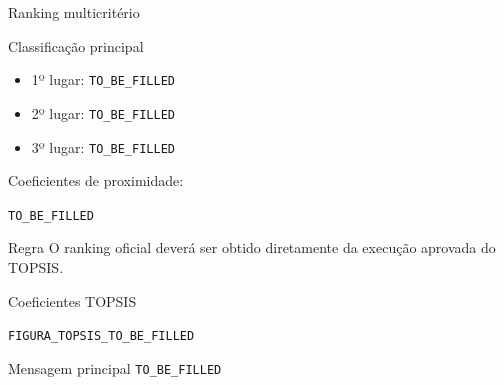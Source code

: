%
%



\begin{frame}{Ranking multicritério}

    \begin{block}{Classificação principal}
        \begin{itemize}
            \item 1º lugar:
                  \texttt{TO\_BE\_FILLED}

            \item 2º lugar:
                  \texttt{TO\_BE\_FILLED}

            \item 3º lugar:
                  \texttt{TO\_BE\_FILLED}
        \end{itemize}
    \end{block}

    \vspace{0.3cm}

    Coeficientes de proximidade:

    \begin{center}
        \texttt{TO\_BE\_FILLED}
    \end{center}

    \vspace{0.2cm}

    \begin{alertblock}{Regra}
        O ranking oficial deverá ser obtido diretamente da execução
        aprovada do TOPSIS.
    \end{alertblock}

\end{frame}



\begin{frame}{Coeficientes TOPSIS}

    \begin{center}

        \texttt{FIGURA\_TOPSIS\_TO\_BE\_FILLED}

    \end{center}

    \vspace{0.3cm}

    \begin{block}{Mensagem principal}
        \texttt{TO\_BE\_FILLED}
    \end{block}

\end{frame}

